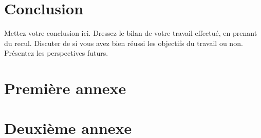 \documentclass[12pt,a4paper,oneside,titlepage]{report}
\begin{document}
\chapter*{Conclusion}
\renewcommand{\leftmark}{CONCLUSION}

Mettez votre conclusion ici.  Dressez le bilan de votre travail effectué, en prenant du recul. Discuter de si vous avez bien réussi les objectifs du travail ou non. Présentez les perspectives futurs.

\newpage




\newpage
\appendix
{}

\chapter{Premi\`ere annexe}
\renewcommand{\leftmark}{ANNEXE \thechapter.~~Premi\`ere annexe}
\label{annexe1}

\chapter{Deuxi\`eme annexe}
\renewcommand{\leftmark}{ANNEXE \thechapter.~~Deuxi\`eme annexe}
\label{annexe2}

\end{document}
